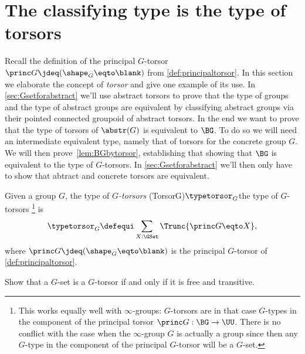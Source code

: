 \section{The classifying type is the type of torsors}
\label{sec:torsors}
Recall the definition of the principal $G$-torsor
$\princ G \jdeq (\sh_G \eqto \blank)$ from \cref{def:principaltorsor}. In this
section we elaborate the concept of {\em torsor} and give one example of its
use. In \cref{sec:Gsetforabstract} we'll use abstract torsors to prove that the
type of groups and the type of abstract groups are equivalent by classifying
abstract groups via their pointed connected groupoid of abstract torsors. In the
end we want to prove that the type of torsors of $\abstr(G)$ is equivalent to
$\BG$. To do so we will need an intermediate equivalent type, namely that of
torsors for the concrete group $G$. We will then prove~\cref{lem:BGbytorsor},
establishing that showing that $\BG$ is equivalent to the type of
$G$-torsors. In \cref{sec:Gsetforabstract} we'll then only have to show that
abtract and concrete torsors are equivalent.
\begin{definition}\label{def:Gtorsor}
  Given a group $G$, the type of \emph{$G$-torsors}%
  \glossary(TorsorG){$\protect\typetorsor_G$}{the type of $G$-torsors}%
  \footnote{This works equally well with $\infty$-groups: $G$-torsors are in that case $G$-types in the component of the principal torsor $\princ G:\BG\to\UU$. There is no conflict with the case when the $\infty$-group $G$ is actually a group since then any $G$-type in the component of the principal $G$-torsor will be a $G$-set.}
  is
  \[
    \typetorsor_G\defequi\sum_{X:\GSet}\Trunc{\princ G \eqto X},
  \]
  where $\princ G \jdeq (\sh_G \eqto \blank)$ is the 
  principal $G$-torsor of \cref{def:principaltorsor}.
\end{definition}

\begin{xca}\label{xca:torsor=free+transitive}
  Show that a $G$-set is a $G$-torsor if and only if it is free and transitive.
\end{xca}

